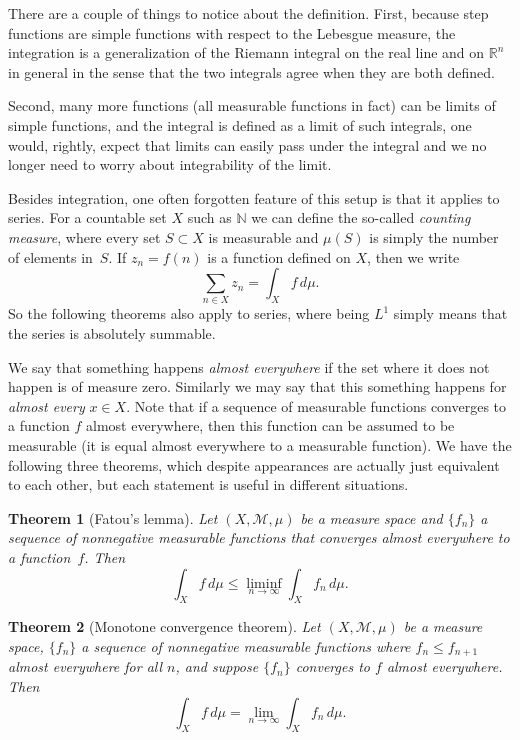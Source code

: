 \documentclass[12pt,openany]{book}
\newcommand{\R}{{\mathbb{R}}}
\newcommand{\N}{{\mathbb{N}}}
\newcommand{\sM}{{\mathscr{M}}}
\newcommand{\myindex}[1]{#1\index{#1}}
\theoremstyle{plain}
\newtheorem{thm}{Theorem}[section]
\theoremstyle{remark}
\theoremstyle{definition}
\theoremstyle{exercise}
\theoremstyle{example}
\begin{document}
There are a couple of things to notice about the definition.  First,
because step functions are simple functions with respect to the Lebesgue measure,
the integration is a generalization of the Riemann integral on the real line
and on $\R^n$ in general in the sense that the two integrals agree when they
are both defined.

Second, many more functions (all measurable functions in fact)
can be limits of simple functions, and the integral is defined as a limit of
such integrals, one would, rightly, expect that limits can easily pass under
the integral and we no longer need to worry about integrability of the
limit.

Besides integration, one often forgotten feature of this setup is that it
applies to series.  For a countable set $X$ such as $\N$ we can define
the so-called \emph{\myindex{counting measure}}, where every set $S \subset
X$ is measurable and $\mu(S)$ is simply the number of elements in~$S$.
If $z_n = f(n)$ is a function defined on $X$, then we write
\begin{equation*}
\sum_{n \in X} z_n = \int_X f \, d\mu .
\end{equation*}
So the following theorems also apply to series, where being $L^1$ simply
means that the series is absolutely summable.

We say that something happens \emph{\myindex{almost everywhere}} if the set
where it does not happen is of measure zero.  Similarly we may say that this
something happens for \emph{almost every} $x \in X$.  Note that if a
sequence of measurable functions converges to a function $f$ almost
everywhere, then this function can be assumed to be measurable (it is equal
almost everywhere to a measurable function).  We have the following three
theorems, which despite appearances are actually just equivalent to each
other, but each statement is useful in different situations.

\begin{thm}[Fatou's lemma]
\pagebreak[2]
Let $(X,\sM,\mu)$ be a measure space and
$\{ f_n \}$ a sequence of nonnegative measurable functions that converges
almost everywhere to a function~$f$.  Then
\begin{equation*}
\int_X f \, d\mu \leq \liminf_{n\to \infty} \int_X f_n \, d\mu .
\end{equation*}
\end{thm}

\begin{thm}[Monotone convergence theorem]
\pagebreak[2]
Let $(X,\sM,\mu)$ be a measure space,
$\{ f_n \}$ a sequence of nonnegative measurable functions
where $f_n \leq f_{n+1}$ almost everywhere for all $n$, and suppose $\{f_n
\}$ converges to $f$ almost everywhere.  Then
\begin{equation*}
\int_X f \, d\mu = \lim_{n\to \infty} \int_X f_n \, d\mu .
\end{equation*}
\end{thm}
\end{document}
